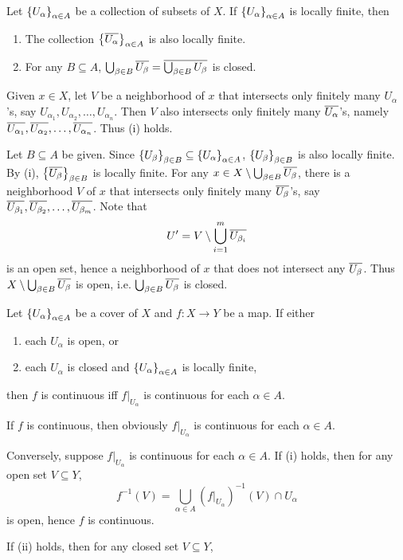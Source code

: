 \begin{prop}
    Let $\set{U_\alpha}_{\alpha\in A}$ be a collection of subsets of $X$. If $\set{U_\alpha}_{\alpha\in A}$ is locally finite, then
    \begin{enumerate}[label={(\roman*)}]
        \item The collection $\set{\Bar{U_\alpha}}_{\alpha\in A}$ is also locally finite.
        \item For any $B \subseteq A$, $\bigcup_{\beta \in B} \Bar{U_\beta} = \Bar{\bigcup_{\beta\in B} U_\beta}$ is closed.
    \end{enumerate}
    \begin{pf}
        Given $x\in X$, let $V$ be a neighborhood of $x$ that intersects only finitely many $U_\alpha$'s, say $U_{\alpha_1}, U_{\alpha_2}, \ldots, U_{\alpha_n}$. Then $V$ also intersects only finitely many $\Bar{U_\alpha}$'s, namely $\Bar{U_{\alpha_1}}, \Bar{U_{\alpha_2}}, \ldots, \Bar{U_{\alpha_n}}$. Thus (i) holds.

        Let $B \subseteq A$ be given. Since $\set{U_\beta}_{\beta\in B} \subseteq \set{U_\alpha}_{\alpha\in A}$, $\set{U_\beta}_{\beta\in B}$ is also locally finite. By (i), $\set{\Bar{U_\beta}}_{\beta\in B}$ is locally finite. For any $x\in X\setminus \bigcup_{\beta\in B} \Bar{U_\beta}$, there is a neighborhood $V$ of $x$ that intersects only finitely many $\Bar{U_\beta}$'s, say $\Bar{U_{\beta_1}}, \Bar{U_{\beta_2}}, \ldots, \Bar{U_{\beta_m}}$. Note that
        \[
        U' = V \setminus \bigcup_{i=1}^m \Bar{U_{\beta_i}}
        \]
        is an open set, hence a neighborhood of $x$ that does not intersect any $\Bar{U_\beta}$. Thus $X\setminus \bigcup_{\beta\in B} \Bar{U_\beta}$ is open, i.e. $\bigcup_{\beta\in B} \Bar{U_\beta}$ is closed.
    \end{pf}
\end{prop}

\begin{lm}
    Let $\set{U_\alpha}_{\alpha\in A}$ be a cover of $X$ and $f: X\to Y$ be a map. If either
    \begin{enumerate}[label={(\roman*)}]
        \item each $U_\alpha$ is open, or
        \item each $U_\alpha$ is closed and $\set{U_\alpha}_{\alpha\in A}$ is locally finite,
    \end{enumerate}
    then $f$ is continuous iff $f|_{U_\alpha}$ is continuous for each $\alpha\in A$.
    \begin{pf}
        If $f$ is continuous, then obviously $f|_{U_\alpha}$ is continuous for each $\alpha\in A$.

        Conversely, suppose $f|_{U_\alpha}$ is continuous for each $\alpha\in A$. If (i) holds, then for any open set $V\subseteq Y$,
        \[
        f^{-1}(V) = \bigcup_{\alpha\in A} (f|_{U_\alpha})^{-1}(V) \cap U_\alpha
        \]
        is open, hence $f$ is continuous.

        If (ii) holds, then for any closed set $V\subseteq Y$, 
    \end{pf}
\end{lm}


